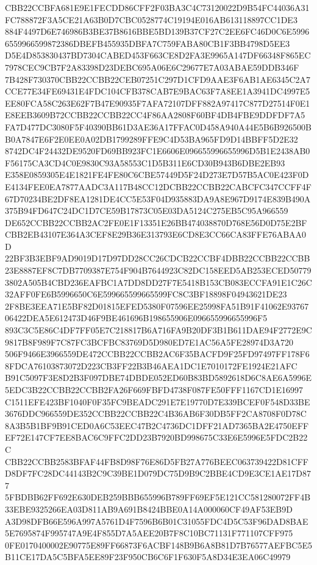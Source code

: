 \documentclass[UTF8,fontset=fandol,zihao=-4,a4paper]{ctexart}
\begin{document}
{{CBB22CCBFA681E9E1FECDD86CFF2F03BA3C4C73120022D9B54FC44036A31FC788872F3A5CE21A63B0D7CBC0528774C19194E016AB613118897CC1DE3
884F4497D6E746986B3BE37B8616BBE5BD139B37CF27C2EE6FC46D0C6E59966559966599872386DBEFB455935DBFA7C759FABA80CB1F3BB4798D5EE3
D5E4D853830437BD7304CABED453F663CE8D2FA3E9965A147DF66348F865EC7978CEC9CB7F2A83398D23DEBC695A06E6C29677E7A03ABAE59DDB346F
7B428F730370CBB22CCBB22CEB07251C297D1CFD9AAE3F6AB1AE6345C2A7CCE77E34FE69431E4FDC104CFB378CAB7E9BAC63F7A8EE1A3941DC4997E5
EE80FCA58C263E62F7B47E90935F7AFA72107DFF882A97417C877D27514F0E1E8EEB3609B72CCBB22CCBB22CC4F86AA2808F60BF4DB4FBE9DDFDF7A5
FA7D477DC3080F5F40390BB61D3AE36A17FFAC0D458A940A44E5B6B926500BB0A7847E6F2E0EE0A02DB1799289FFE9C4D53BA965FD9D14BBFF5D2E32
8742DC4F24432DE9520FD69BB923FC1E6606E096655996655996D5B1E2438AB0F56175CA3CD4C0E9830C93A58553C1D5B311E6CD30B943B6DBE2EB93
E358E0859305E4E1821FE4FE80C6CBE57449D5F24D273E7D57B5AC0E423F0DE4134FEE0EA7877AADC3A117B48CC12DCBB22CCBB22CABCFC347CCFF4F
67D70234BE2DF8EA1281DE4CC5E53F04D935883DA9A8E967D9174E839B490A375B94FD647C24DC1D7CE59B17873C05E03DA5124C275EB5C95A966559
DE652CCBB22CCBB2AC2FE0E1F13351E26BB474038870D768E56D0D75E2BFCBB2EB43107E364A3CEF8E29B36E313793E6CD8E3CC66CA83FFE76ABAA0D
22BF3B3EBF9AD9019D17D97DD28CC26CDCB22CCBF4DBB22CCBB22CCBB23E8887EF8C7DB7709387E754F904B7644923C82DC158EED5AB253ECED50779
3802A505B4CBD236EAFBC1A7DD8DD27F7E5418B153CB083ECCFA91E1C26C32AFF0FE6B5996650C6E599665599665599FC8C3BF18898F04943621DE23
2F8BE3EEA71E5BF82D01815EFED5380F07596EE25998FA51B91F41062E9376706422DEA5E612473D46F9BE461696B198655906E096655996655996F5
893C3C5E86C4DF7FF05E7C218817B6A716FA9B20DF3B1B611DAE94F2772E9C9817B8F989F7C87FC3BCFBC83769D5D980ED7E1AC56A5FE28974D3A720
506F9466E3966559DE472CCBB22CCBB2AC6F35BACFD9F25FD97497FF178F68FDCA76103873072D223CB3FF22B3B46AEA1DC1E7010172FE1924E21AFC
B91C5097F3E8D2B3F097DBE74DBDE052ED60B83BD5892618D6C8AE6A5996E5EDC3B22CCBB22CCBB2FA26F669FBFD4738F087FE50FFF1167CD1E16997
C1511EFE423BF1040F0F35FC9BEADC291E7E19770D7E339BCEF0F548D33BE3676DDC966559DE352CCBB22CCBB22C4B36AB6F30DB5FF2CA8708F0D78C
8A3B5B1BF9B91CED0A6C53EEC47B2C4736DC1DFF21AD7365BA2E4750EFFEF72E147CF7EE8BAC6C9FFC2DD23B7920BD998675C33E6E5996E5FDC2B22C
CBB22CCBB2583BFAF44FB8D98F76E86D5FB27A776BEEC063739422D81CFFD8DF7FC28DC44143B2C9C39BE1D079DC75D9B9C2BBE4CD9E3CE1AE17D877
5FBDBB62FF692E630DEB259BBB655996B789FF69EF5E121CC581280072FF4B33EBE9325266EA03D811AB9A691B8424BBE0A14A000060CF49AF53EB9D
A3D98DFB66E596A997A5761D4F7596B6B01C31055FDC4D5C53F96DAD8BAE5E7695874F995747A9E4F855D7A5AEE20B7F8C10BC71131F771107CFF975
0FE0170400002E90775E89FF66873F6ACBF148B9B6A8B81D7B76577AEFBC5E5B11CE17DA5C5BFA5EE89F23F950CB6C6F1F630F5A8D34E3EA06C49979
}}
\end{document}
